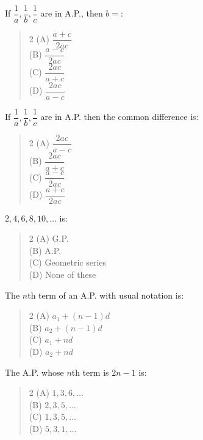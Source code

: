 \documentclass[11pt,a4paper]{article}
\begin{document}
\begin{mcqlist}
\item If $\dfrac{1}{a},\dfrac{1}{b},\dfrac{1}{c}$ are in A.P., then $b=$:
\begin{quote}\begin{multicols}{2}
\noindent (A) $\dfrac{a+c}{2ac}$ \\
(B) $\dfrac{a-c}{2ac}$ \\
(C) $\dfrac{2ac}{a+c}$ \\
(D) $\dfrac{2ac}{a-c}$
\end{multicols}\end{quote}

\item If $\dfrac{1}{a},\dfrac{1}{b},\dfrac{1}{c}$ are in A.P. then the common difference is:
\begin{quote}\begin{multicols}{2}
\noindent (A) $\dfrac{2ac}{a-c}$ \\
(B) $\dfrac{2ac}{a+c}$ \\
(C) $\dfrac{a-c}{2ac}$ \\
(D) $\dfrac{a+c}{2ac}$
\end{multicols}\end{quote}

\item $2,4,6,8,10,\ldots$ is:
\begin{quote}\begin{multicols}{2}
\noindent (A) G.P. \\
(B) A.P. \\
(C) Geometric series \\
(D) None of these
\end{multicols}\end{quote}

\item The $n$th term of an A.P. with usual notation is:
\begin{quote}\begin{multicols}{2}
\noindent (A) $a_1+(n-1)d$ \\
(B) $a_2+(n-1)d$ \\
(C) $a_1+nd$ \\
(D) $a_2+nd$
\end{multicols}\end{quote}

\item The A.P. whose $n$th term is $2n-1$ is:
\begin{quote}\begin{multicols}{2}
\noindent (A) $1,3,6,\ldots$ \\
(B) $2,3,5,\ldots$ \\
(C) $1,3,5,\ldots$ \\
(D) $5,3,1,\ldots$
\end{multicols}\end{quote}


\end{mcqlist}
\end{document}
